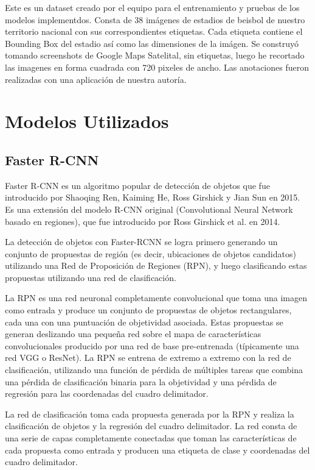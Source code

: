\documentclass[article]{llncs}
\begin{document}
Este es un dataset creado por el equipo para el entrenamiento y pruebas de los modelos implementdos. Consta de 38 
im\'agenes de estadios de beisbol de nuestro territorio nacional con sus correspondientes etiquetas. Cada etiqueta 
contiene el Bounding Box del estadio as\'i como las dimensiones de la im\'agen. Se construy\'o tomando screenshots 
de Google Maps Satelital, sin etiquetas, luego he recortado las imagenes en forma cuadrada con 720 pixeles de ancho. 
Las anotaciones fueron realizadas con una aplicaci\'on de nuestra autor\'ia.

\section{Modelos Utilizados}

\subsection{Faster R-CNN}
Faster R-CNN es un algoritmo popular de detección de objetos que fue introducido por Shaoqing Ren, 
Kaiming He, Ross Girshick y Jian Sun en 2015. Es una extensión del modelo R-CNN original (Convolutional Neural 
Network basado en regiones), que fue introducido por Ross Girshick et al. en 2014.

La detección de objetos con Faster-RCNN se logra primero generando un conjunto de propuestas de región 
(es decir, ubicaciones de objetos candidatos) utilizando una Red de Proposición de Regiones (RPN), y luego 
clasificando estas propuestas utilizando una red de clasificación.

La RPN es una red neuronal completamente convolucional que toma una imagen como entrada y produce un conjunto de 
propuestas de objetos rectangulares, cada una con una puntuación de objetividad asociada. Estas propuestas se generan 
deslizando una pequeña red sobre el mapa de características convolucionales producido por una red de base pre-entrenada 
(típicamente una red VGG o ResNet). La RPN se entrena de extremo a extremo con la red de clasificación, utilizando una 
función de pérdida de múltiples tareas que combina una pérdida de clasificación binaria para la objetividad y una 
pérdida de regresión para las coordenadas del cuadro delimitador.

La red de clasificación toma cada propuesta generada por la RPN y realiza la clasificación de objetos y la regresión 
del cuadro delimitador. La red consta de una serie de capas completamente conectadas que toman las características de 
cada propuesta como entrada y producen una etiqueta de clase y coordenadas del cuadro delimitador.
\end{document}

